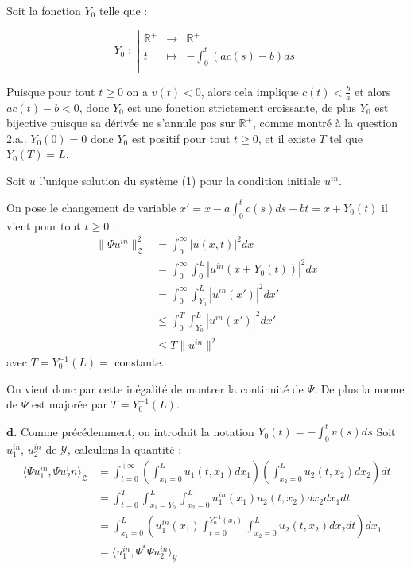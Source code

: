 \documentclass[a4paper]{article}
\newcommand{\Z}{\mathscr{Z}}
\begin{document}
Soit la fonction $Y_0$ telle que :

\[Y_0 \; : \; \left\vert
	\begin{array}{ccc}
	\mathbb{R}^+ & \to & \mathbb{R}^+\\
	t & \mapsto & -\int_0^t (ac(s)-b)ds \\
	\end{array} \right.
\]

Puisque pour tout $t \geq 0 $ on a $v(t)<0$,
alors cela implique $c(t)< \frac{b}{a}$ et alors $ac(t)-b<0$, donc $Y_0$ est une fonction strictement croissante, de plus $Y_0$ est bijective puisque sa dérivée ne s'annule pas sur $\mathbb{R}^+$, comme montré à la question 2.a..
$Y_0 (0) =0$ donc $Y_0$ est positif pour tout $t \geq 0$,
et il existe $T$ tel que $Y_0(T) = L$.

Soit $u$ l'unique solution du système (1) pour la condition initiale $u^{in}$.

On pose le changement de variable $x'=x - a\int_0^tc(s)ds + bt = x + Y_0 (t)$ il vient pour tout $t \geq 0$ :
\[ \begin{split}
\|\Psi u^{in}\|_{\Z}^2 &= \int_0^\infty |u(x,t)|^2 dx \\
			   &= \int_0^\infty \int_0^L |u^{in}( x + Y_0 (t))|^2 dx \\
			   &= \int_0^\infty \int_{Y_0}^{L} |u^{in}(x')|^2 dx' \\
			   & \leq \int_0^T \int_{Y_0}^L |u^{in}(x')|^2 dx'\\
			   & \leq T \| u^{in} \|^2
\end{split}\]
avec $T = Y_0^{-1}(L) =$ constante.

On vient donc par cette inégalité de montrer la continuité de $\Psi$. De plus la norme de $\Psi$ est majorée par $T = Y_0 ^{-1}(L)$.

\textbf{d.}
Comme précédemment, on introduit la notation $Y_0(t)= -\int_0^t v(s)ds$
Soit $u_1^{in}$, $u_2^{in}$ de $\mathscr{Y}$,
calculons la quantité :
\[
\begin{split}
	\langle \Psi u_1^{in}, \Psi u_2^in \rangle_{\mathscr{Z}}  
	                                  &= \int_{t=0}^{+\infty} 
									  (\int_{x_1=0}^L u_1(t,x_1)dx_1)
									  (\int_{x_2=0}^L u_2(t,x_2) dx_2)
									  dt\\
	                                  &= \int_{t=0}^{T} 
									  \int_{x_1=Y_0}^L \int_{x_2=0}^L
									  u_1^{in}(x_1)
									   u_2(t,x_2) 
									  dx_2dx_1dt\\
	                                  &= \int_{x_1=0}^L
									  (u_1^{in}(x_1)
									  \int_{t=0}^{Y_0^{-1}(x_1)} 
									   \int_{x_2=0}^L
									   u_2(t,x_2) 
									  dx_2 dt )dx_1\\
	                                  &= \langle u_1^{in},
									  \Psi^* \Psi u_2^{in} \rangle_{\mathscr{Y}}
\end{split}
\]
\end{document}
